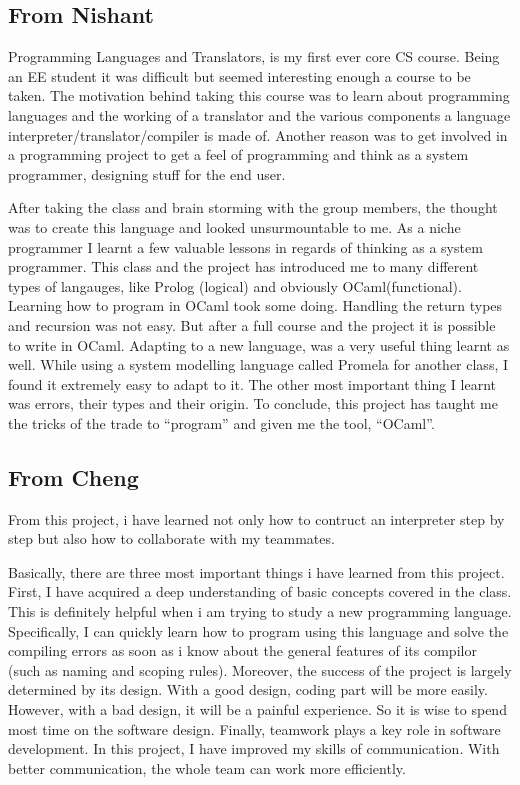 \documentclass[onecolumn,titlepage]{article}
\begin{document}
\subsection{From Nishant}

Programming Languages and Translators, is my first ever core CS
course. Being an EE student it was difficult but seemed interesting
enough a course to be taken. The motivation behind taking this course
was to learn about programming languages and the working of a
translator and the various components a language
interpreter/translator/compiler is made of. Another reason was to get
involved in a programming project to get a feel of programming and
think as a system programmer, designing stuff for the end user.

After taking the class and brain storming with the group members, the
thought was to create this language and looked unsurmountable to
me. As a niche programmer I learnt a few valuable lessons in regards
of thinking as a system programmer. This class and the project has
introduced me to many different types of langauges, like Prolog
(logical) and obviously OCaml(functional). Learning how to program in
OCaml took some doing. Handling the return types and recursion was not
easy. But after a full course and the project it is possible to write
in OCaml.  Adapting to a new language, was a very useful thing learnt
as well. While using a system modelling language called Promela for
another class, I found it extremely easy to adapt to it. The other
most important thing I learnt was errors, their types and their
origin. To conclude, this project has taught me the tricks of the
trade to ``program'' and given me the tool, ``OCaml''.

\subsection{From Cheng}
From this project, i have learned not only how to contruct an
interpreter step by step but also how to collaborate with my
teammates.

Basically, there are three most important things i have learned from
this project. First, I have acquired a deep understanding of basic
concepts covered in the class. This is definitely helpful when i am
trying to study a new programming language. Specifically, I can
quickly learn how to program using this language and solve the
compiling errors as soon as i know about the general features of its
compilor (such as naming and scoping rules). Moreover, the success of
the project is largely determined by its design. With a good design,
coding part will be more easily. However, with a bad design, it will
be a painful experience. So it is wise to spend most time on the
software design. Finally, teamwork plays a key role in software
development. In this project, I have improved my skills of
communication. With better communication, the whole team can work more
efficiently.
\end{document}
